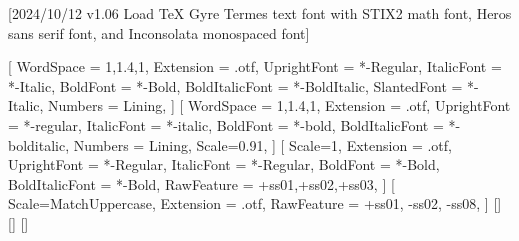 
[2024/10/12 v1.06 Load TeX Gyre Termes text font with STIX2 math font, Heros sans serif font, and Inconsolata monospaced font]

%
%
\ifpdftex
	\RequirePackage[T1]{fontenc}	
	\RequirePackage{bm}
\else
    \RequirePackage[warnings-off={mathtools-colon,mathtools-overbracket}]{unicode-math}
    \setmainfont{TeXGyreTermesX}[%
		WordSpace = {1,1.4,1},%
    	Extension = .otf,
    	UprightFont = *-Regular,
    	ItalicFont = *-Italic,
    	BoldFont = *-Bold,
    	BoldItalicFont = *-BoldItalic,
		SlantedFont = *-Italic,
		Numbers = Lining,
	]
	\setsansfont{texgyreheros}[%
		WordSpace = {1,1.4,1},
		Extension = .otf,
    	UprightFont = *-regular,
    	ItalicFont = *-italic,
    	BoldFont = *-bold,
    	BoldItalicFont = *-bolditalic,
		Numbers = Lining,
    	Scale=0.91,%
	]        
	\setmonofont{Inconsolatazi4}[%
        Scale=1,%
        Extension = .otf,
        UprightFont = *-Regular,
        ItalicFont = *-Regular,%
        BoldFont = *-Bold, 
    	BoldItalicFont = *-Bold,%
        RawFeature = {+ss01,+ss02,+ss03},
    ]             
	[%
    	Scale=MatchUppercase,
    	Extension = .otf,
    	RawFeature = {+ss01, -ss02, -ss08},
   ]
   \setmathfontface{}[]%
   \setmathfontface{}[]
   \setmathfontface{}[]%
   \newcommand*{\FRAC}[1]{{\addfontfeature{Fractions=On}#1}}%
\fi
